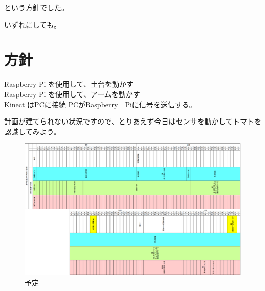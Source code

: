 という方針でした。

いずれにしても。

\section{方針}
Raspberry Pi を使用して、土台を動かす\\
Raspberry Pi を使用して、アームを動かす\\
Kinect はPCに接続
PCがRaspberry　Piに信号を送信する。

計画が建てられない状況ですので、とりあえず今日はセンサを動かしてトマトを認識してみよう。

\begin{figure}[htbp]
\begin{center}
\includegraphics[width=25cm,angle=90]{../arc_plan.eps}
\end{center}
\caption{予定}
\end{figure}

